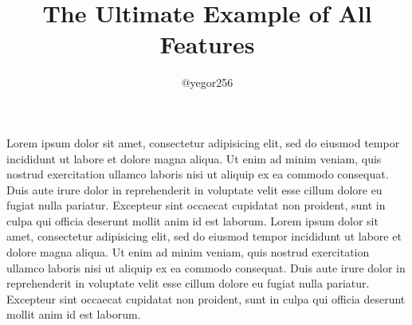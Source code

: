 \documentclass{article}
\title{The Ultimate Example of All Features}
\author{@yegor256}
\begin{document}

\pptToc









\begin{pptWide}{3}
Lorem ipsum dolor sit amet, consectetur adipisicing elit, sed do eiusmod
tempor incididunt ut labore et dolore magna aliqua. Ut enim ad minim veniam,
quis nostrud exercitation ullamco laboris nisi ut aliquip ex ea commodo
consequat. Duis aute irure dolor in reprehenderit in voluptate velit esse
cillum dolore eu fugiat nulla pariatur. Excepteur sint occaecat cupidatat non
proident, sunt in culpa qui officia deserunt mollit anim id est laborum.
Lorem ipsum dolor sit amet, consectetur adipisicing elit, sed do eiusmod
tempor incididunt ut labore et dolore magna aliqua. Ut enim ad minim veniam,
quis nostrud exercitation ullamco laboris nisi ut aliquip ex ea commodo
consequat. Duis aute irure dolor in reprehenderit in voluptate velit esse
cillum dolore eu fugiat nulla pariatur. Excepteur sint occaecat cupidatat non
proident, sunt in culpa qui officia deserunt mollit anim id est laborum.
\end{pptWide}
\end{document}
